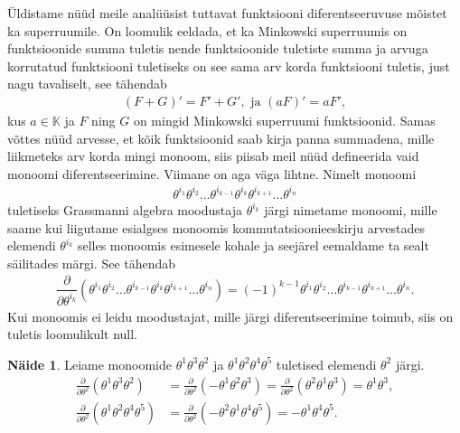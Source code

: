 \documentclass[12pt,a4paper,oneside]{article}
\theoremstyle{plain}
\theoremstyle{definition}
\newtheorem{naide}{Näide}[section]
\numberwithin{equation}{section}
\def\K{{\mathbb K}}
\begin{document}
Üldistame nüüd meile analüüsist tuttavat funktsiooni 
diferentseeruvuse mõistet ka superruumile. On loomulik eeldada, 
et ka Minkowski superruumis on funktsioonide summa tuletis 
nende funktsioonide tuletiste summa ja arvuga korrutatud funktsiooni 
tuletiseks on see sama arv korda funktsiooni tuletis, just nagu 
tavaliselt, see tähendab
\begin{align*}
\left(F + G\right)' = F' + G', \text{ ja } \left(aF\right)' = aF',
\end{align*}
kus $a \in \K$ ja $F$ ning $G$ on mingid Minkowski superruumi 
funktsioonid. Samas võttes nüüd arvesse, et kõik funktsioonid 
saab kirja panna summadena, mille liikmeteks arv korda mingi 
monoom, siis piisab meil nüüd defineerida vaid monoomi 
diferentseerimine. Viimane on aga väga lihtne. Nimelt 
monoomi 
\begin{align*}
\theta^{i_1} \theta^{i_2} \ldots \theta^{i_{k-1}} 
\theta^{i_k} \theta^{i_{k+1}} \ldots \theta^{i_n}
\end{align*}
tuletiseks Grassmanni algebra moodustaja $\theta^{i_k}$ järgi 
nimetame monoomi, mille saame kui liigutame esialgses monoomis
kommutatsioonieeskirju arvestades elemendi $\theta^{i_k}$ selles 
monoomis esimesele kohale ja seejärel eemaldame ta sealt 
säilitades märgi. See tähendab
\begin{align*}
\dfrac{\partial}{\partial \theta^{i_k}} \left(
\theta^{i_1} \theta^{i_2} \ldots \theta^{i_{k-1}} 
\theta^{i_k} \theta^{i_{k+1}} \ldots \theta^{i_n}
\right) = 
\left(-1\right)^{k-1} \theta^{i_1} \theta^{i_2} \ldots 
\theta^{i_{k-1}} \theta^{i_{k+1}} \ldots \theta^{i_n}.
\end{align*}
Kui monoomis ei leidu moodustajat, mille järgi 
diferentseerimine toimub, siis on tuletis loomulikult null.

\begin{naide}
Leiame monoomide $\theta^1 \theta^3 \theta^2$ ja 
$\theta^1 \theta^2 \theta^4 \theta^5$ tuletised elemendi 
$\theta^2$ järgi.
\begin{align*}
\frac{\partial}{\partial \theta^2} 
	\left( \theta^1 \theta^3 \theta^2\right) &= 
\frac{\partial}{\partial \theta^2} 
	\left(-\theta^1 \theta^2 \theta^3 \right) = 
\frac{\partial}{\partial \theta^2} 
	\left(\theta^2 \theta^1 \theta^3 \right) = \theta^1 \theta^3,\\
%
\frac{\partial}{\partial \theta^2} 
	\left( \theta^1 \theta^2 \theta^4 \theta^5 \right) &= 
\frac{\partial}{\partial \theta^2} 
	\left(- \theta^2 \theta^1 \theta^4 \theta^5 \right) = 
	- \theta^1 \theta^4 \theta^5.
\end{align*}
\end{naide}
\end{document}
